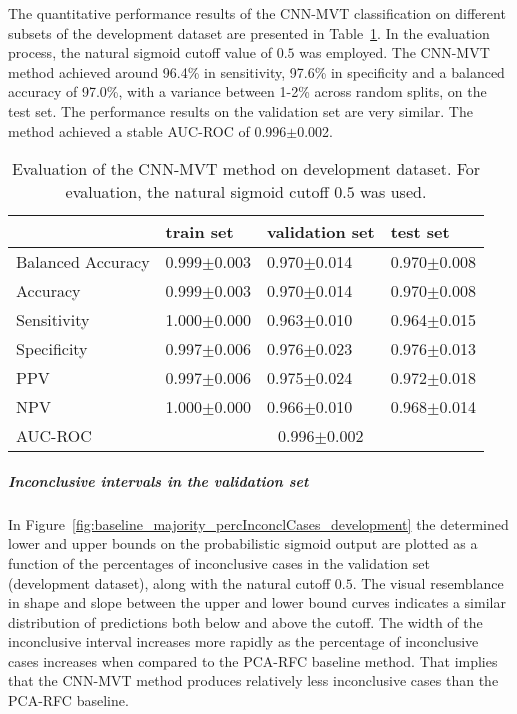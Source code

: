 The quantitative performance results of the CNN-MVT classification on 
different subsets of the development dataset are presented in Table~\ref{t1:cnn_mvt_perf_eval_table}.
In the evaluation process, the natural sigmoid cutoff value of $0.5$ was employed.
The CNN-MVT method achieved around 96.4\% in sensitivity, 97.6\% in specificity and a balanced accuracy of 97.0\%, 
with a variance between 1-2\% across random splits, on the test set.
The performance results on the validation set are very similar.
The method achieved a stable AUC-ROC of 0.996$\pm$0.002.


\begin{table}[ht]
  \caption{Evaluation of the CNN-MVT method on development dataset. 
  For evaluation, the natural sigmoid cutoff $0.5$ was used.}
  \centering
  \begin{tabular}{llll}
      \hline
                        & train set         & validation set      & test set             \\
      \hline
      Balanced Accuracy & 0.999$\pm$0.003   &  0.970$\pm$0.014    &  0.970$\pm$0.008   \\
      Accuracy          & 0.999$\pm$0.003    &   0.970$\pm$0.014   &  0.970$\pm$0.008   \\
      Sensitivity       &  1.000$\pm$0.000   &   0.963$\pm$0.010   &  0.964$\pm$0.015  \\
      Specificity       &   0.997$\pm$0.006   &   0.976$\pm$0.023  &   0.976$\pm$0.013  \\
      PPV               &  0.997$\pm$0.006   &   0.975$\pm$0.024   &  0.972$\pm$0.018 \\
      NPV               &  1.000$\pm$0.000    &   0.966$\pm$0.010   & 0.968$\pm$0.014  \\
      \hline
      AUC-ROC          &  \multicolumn{3}{c}{0.996$\pm$0.002}  \\
      \hline
  \end{tabular}
 \label{t1:cnn_mvt_perf_eval_table}
\end{table}

\subparagraph{Inconclusive intervals in the validation set}

In Figure~\ref{fig:baseline_majority_percInconclCases_development} the determined lower and upper bounds on the 
probabilistic sigmoid output are plotted as a function of the percentages of inconclusive cases 
in the validation set (development dataset), along with the natural cutoff $0.5$.
The visual resemblance in shape and slope between the upper and lower bound curves 
indicates a similar distribution of predictions both below and above the cutoff.
The width of the inconclusive interval increases more rapidly as the percentage of inconclusive cases increases 
when compared to the PCA-RFC baseline method.
That implies that the CNN-MVT method produces relatively less inconclusive cases than the PCA-RFC baseline.


